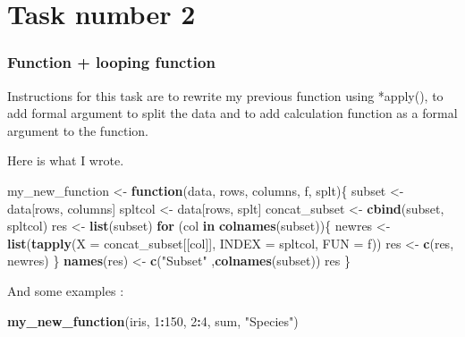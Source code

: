 \documentclass[
]{article}
\newenvironment{Shaded}{\begin{snugshade}}{\end{snugshade}}
\newcommand{\ControlFlowTok}[1]{\textcolor[rgb]{0.13,0.29,0.53}{\textbf{#1}}}
\newcommand{\DataTypeTok}[1]{\textcolor[rgb]{0.13,0.29,0.53}{#1}}
\newcommand{\DecValTok}[1]{\textcolor[rgb]{0.00,0.00,0.81}{#1}}
\newcommand{\KeywordTok}[1]{\textcolor[rgb]{0.13,0.29,0.53}{\textbf{#1}}}
\newcommand{\NormalTok}[1]{#1}
\newcommand{\OperatorTok}[1]{\textcolor[rgb]{0.81,0.36,0.00}{\textbf{#1}}}
\newcommand{\StringTok}[1]{\textcolor[rgb]{0.31,0.60,0.02}{#1}}
\begin{document}
\hypertarget{task-number-2}{%
\section{Task number 2}\label{task-number-2}}

\hypertarget{function-looping-function}{%
\subsubsection{Function + looping
function}\label{function-looping-function}}

Instructions for this task are to rewrite my previous function using
*apply(), to add formal argument to split the data and to add
calculation function as a formal argument to the function.

Here is what I wrote.

\begin{Shaded}
\begin{Highlighting}[]
\NormalTok{my_new_function <-}\StringTok{ }\ControlFlowTok{function}\NormalTok{(data, rows, columns, f, splt)\{}
\NormalTok{  subset <-}\StringTok{ }\NormalTok{data[rows, columns]}
\NormalTok{  spltcol <-}\StringTok{ }\NormalTok{data[rows, splt]}
\NormalTok{  concat_subset <-}\StringTok{ }\KeywordTok{cbind}\NormalTok{(subset, spltcol)}
\NormalTok{  res <-}\StringTok{ }\KeywordTok{list}\NormalTok{(subset)}
  \ControlFlowTok{for}\NormalTok{ (col }\ControlFlowTok{in} \KeywordTok{colnames}\NormalTok{(subset))\{}
\NormalTok{    newres <-}\StringTok{ }\KeywordTok{list}\NormalTok{(}\KeywordTok{tapply}\NormalTok{(}\DataTypeTok{X =}\NormalTok{ concat_subset[[col]], }\DataTypeTok{INDEX =}\NormalTok{ spltcol, }\DataTypeTok{FUN =}\NormalTok{ f))}
\NormalTok{    res <-}\StringTok{ }\KeywordTok{c}\NormalTok{(res, newres)}
\NormalTok{  \}}
  \KeywordTok{names}\NormalTok{(res) <-}\StringTok{ }\KeywordTok{c}\NormalTok{(}\StringTok{"Subset"}\NormalTok{ ,}\KeywordTok{colnames}\NormalTok{(subset))}
\NormalTok{  res}
\NormalTok{\}}
\end{Highlighting}
\end{Shaded}

And some examples :

\begin{Shaded}
\begin{Highlighting}[]
\KeywordTok{my_new_function}\NormalTok{(iris, }\DecValTok{1}\OperatorTok{:}\DecValTok{150}\NormalTok{, }\DecValTok{2}\OperatorTok{:}\DecValTok{4}\NormalTok{, sum, }\StringTok{"Species"}\NormalTok{)}
\end{Highlighting}
\end{Shaded}
\end{document}
